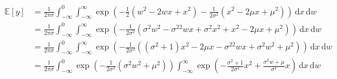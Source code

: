 \documentclass[]{article}
\begin{document}
\begin{align}
\mathbb{E}\left[y\right] &= \frac{1}{2\pi\sigma} \int_{-\infty}^{0} \int_{-\infty}^{\infty} \exp\left(-\frac{1}{2}\left(w^2-2wx+x^2\right)-\frac{1}{2\sigma^2}\left(x^2-2\mu x + \mu^2\right)\right) \,\mathrm{d}x \,\mathrm{d}w \\
&=\frac{1}{2\pi\sigma}\int_{-\infty}^{0}\int_{-\infty}^{\infty}\exp\left(-\frac{1}{2\sigma^2}\left(\sigma^2w^2-\sigma^22wx+\sigma^2x^2 + x^2-2\mu x + \mu^2\right)\right)\,\mathrm{d}x\,\mathrm{d}w \\
&=\frac{1}{2\pi\sigma}\int_{-\infty}^{0}\int_{-\infty}^{\infty}\exp\left(-\frac{1}{2\sigma^2}\left(\left(\sigma^2 +1\right)x^2 - 2\mu x - \sigma^22w x + \sigma^2w^2 +  \mu^2\right)\right)\,\mathrm{d}x\,\mathrm{d}w \\
&=\frac{1}{2\pi\sigma}\int_{-\infty}^{0}\exp\left(-\frac{1}{2\sigma^2}\left(\sigma^2w^2 +  \mu^2\right)\right)\int_{-\infty}^{\infty}\exp\left(-\frac{\sigma^2 +1}{2\sigma^2}x^2 + \frac{\sigma^2w+\mu}{\sigma^2}x\right)\,\mathrm{d}x\,\mathrm{d}w \\
\end{align}
\end{document}
